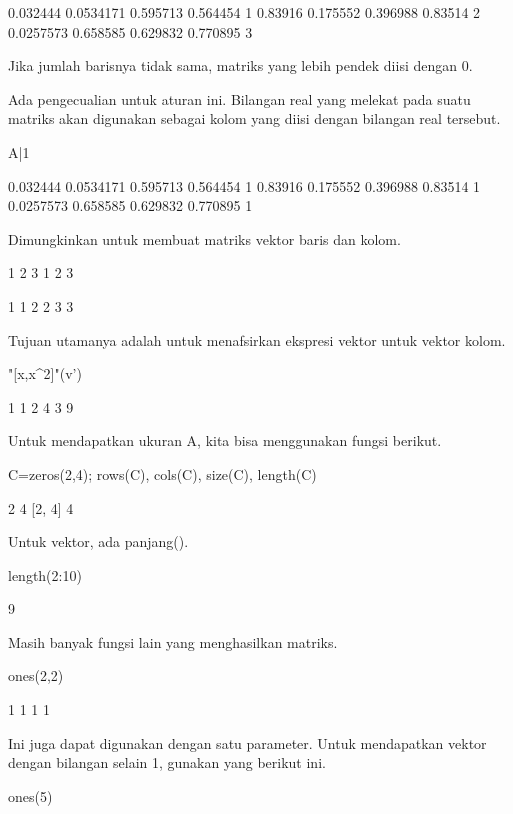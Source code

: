 \documentclass{article}
\begin{document}
         0.032444     0.0534171      0.595713      0.564454             1 
          0.83916      0.175552      0.396988       0.83514             2 
        0.0257573      0.658585      0.629832      0.770895             3 

Jika jumlah barisnya tidak sama, matriks yang lebih pendek diisi
dengan 0.


Ada pengecualian untuk aturan ini. Bilangan real yang melekat pada
suatu matriks akan digunakan sebagai kolom yang diisi dengan bilangan
real tersebut.


\>A|1


         0.032444     0.0534171      0.595713      0.564454             1 
          0.83916      0.175552      0.396988       0.83514             1 
        0.0257573      0.658585      0.629832      0.770895             1 

Dimungkinkan untuk membuat matriks vektor baris dan kolom.


\>[v;v]


                1             2             3 
                1             2             3 

\>[v',v']


                1             1 
                2             2 
                3             3 

Tujuan utamanya adalah untuk menafsirkan ekspresi vektor untuk vektor
kolom.


\>"[x,x^2]"(v')


                1             1 
                2             4 
                3             9 

Untuk mendapatkan ukuran A, kita bisa menggunakan fungsi berikut.


\>C=zeros(2,4); rows(C), cols(C), size(C), length(C)


    2
    4
    [2,  4]
    4

Untuk vektor, ada panjang().


\>length(2:10)


    9

Masih banyak fungsi lain yang menghasilkan matriks.


\>ones(2,2)


                1             1 
                1             1 

Ini juga dapat digunakan dengan satu parameter. Untuk mendapatkan
vektor dengan bilangan selain 1, gunakan yang berikut ini.


\>ones(5)
\end{document}
